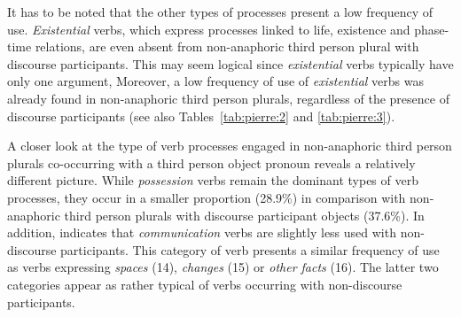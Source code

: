 \documentclass[output=paper]{langscibook}
\begin{document}
It has to be noted that the other types of processes present a low frequency of use. \textit{Existential} verbs, which express processes linked to life, existence and phase-time relations, are even absent from non-anaphoric third person plural with discourse participants. This may seem logical since \textit{existential} verbs typically have only one argument, Moreover, a low frequency of use of \textit{existential} verbs was already found in non-anaphoric third person plurals, regardless of the presence of discourse participants \citep[204]{Pierre2021} (see also Tables~\ref{tab:pierre:2} and \ref{tab:pierre:3}).


A closer look at the type of verb processes engaged in non-anaphoric third person plurals co-occurring with a third person object pronoun reveals a relatively different picture. While \textit{possession} verbs remain the dominant types of verb processes, they occur in a smaller proportion (28.9\%) in comparison with non-anaphoric third person plurals with discourse participant objects (37.6\%). In addition,  indicates that \textit{communication} verbs are slightly less used with non-discourse participants. This category of verb presents a similar frequency of use as verbs expressing \textit{spaces} (14), \textit{changes} (15) or \textit{other facts} (16). The latter two categories appear as rather typical of verbs occurring with non-discourse participants.\largerpage
\end{document}
